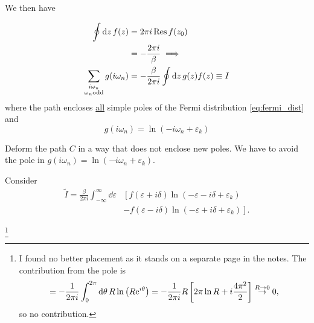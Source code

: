 We then have

\begin{align}
\oint \dd{z}f(z) &= 2\pi i \Res f(z_0) \\ 
&= -\frac{2\pi i}{\beta} \implies \\
\sum_{\substack{i\omega_n \\ \omega_n \text{odd}}} g(i\omega_n) &= -\frac{\beta}{2\pi i}\oint \dd{z}g(z)f(z)\equiv I
\end{align}
where the path encloses \underline{all} simple poles of the Fermi distribution \eqref{eq:fermi_dist} and 
\begin{equation}
g(i\omega_n)=\ln(-i\omega_n + \varepsilon_k)
\end{equation}


\begin{figure}
	\centering
	
\end{figure}

\begin{figure}
	\centering
	\label{fig:path_deform}
	\begin{subfigure}{0.49\textwidth}
		
		
	\end{subfigure}
	\begin{subfigure}{0.49\textwidth}
		
		
	\end{subfigure}
\end{figure}

Deform the path $C$ in a way that does not enclose new poles. We have to avoid the pole in $g(i\omega_n) = \ln(-i\omega_n + \varepsilon_k)$.

Consider 
\begin{align}
\tilde{I} = \frac{\beta}{2\pi i}\int_{-\infty}^\infty\dd{\varepsilon}&\left[f(\varepsilon + i\delta)\ln\left(-\varepsilon -i\delta + \varepsilon_k\right) \right.\nonumber\\
&\left.-f(\varepsilon-i\delta)\ln\left(-\varepsilon  + i\delta + \varepsilon_k\right) \right].
\end{align}

\footnote{I found no better placement as it stands on a separate page in the notes. The contribution from the pole is
	\begin{equation*}
	= -\frac{1}{2\pi i}\int_0^{2\pi}\dd{\theta}R\ln\left(R\mathrm{e}^{i\theta}\right) = -\frac{1}{2\pi i} R\left[2\pi\ln R + i\frac{4\pi^2}{2}\right]
	\stackrel{R \rightarrow 0}{\rightarrow}  0,
	\end{equation*}
	so no contribution.
}

